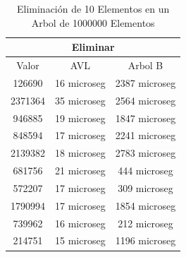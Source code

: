 \documentclass[acmsmall]{acmart}
\begin{document}
\begin{table}[htbp]
\begin{center}
  \caption{Eliminación de 10 Elementos en un Arbol de 1000000 Elementos}
  \begin{tabular}{ccc}
    \toprule
    \multicolumn{3}{c}{Eliminar}\\
    \midrule
     Valor & AVL & Arbol B\\
126690&16 microseg&2387 microseg\\

2371364&35 microseg&2564 microseg\\ 

946885&19 microseg&1847 microseg\\

848594&17 microseg&2241 microseg\\

2139382&18 microseg&2783 microseg\\

681756&21 microseg&444 microseg\\

572207&17 microseg&309 microseg\\

1790994&17 microseg&1854 microseg\\

739962&16 microseg&212 microseg\\

214751&15 microseg&1196 microseg\\


    \bottomrule
  \end{tabular}
  \end{center}
\end{table}
\end{document}
